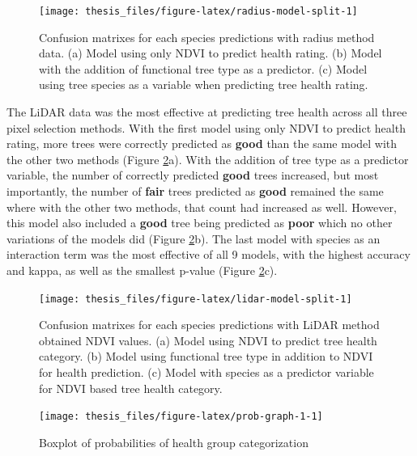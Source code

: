 \documentclass[12pt,twoside]{reedthesis}
\begin{document}
\begin{figure}

{\centering \texttt{[image: thesis\_files/figure-latex/radius-model-split-1]} 

}

\caption[Confusion matrixes for Radius method predictive models]{Confusion matrixes for each species predictions with radius method data. (a) Model using only NDVI to predict health rating. (b) Model with the addition of functional tree type as a predictor. (c) Model using tree species as a variable when predicting tree health rating.}\label{fig:radius-model-split}
\end{figure}
The LiDAR data was the most effective at predicting tree health across all three pixel selection methods. With the first model using only NDVI to predict health rating, more trees were correctly predicted as \textbf{good} than the same model with the other two methods (Figure \ref{fig:lidar-model-split}a). With the addition of tree type as a predictor variable, the number of correctly predicted \textbf{good} trees increased, but most importantly, the number of \textbf{fair} trees predicted as \textbf{good} remained the same where with the other two methods, that count had increased as well. However, this model also included a \textbf{good} tree being predicted as \textbf{poor} which no other variations of the models did (Figure \ref{fig:lidar-model-split}b). The last model with species as an interaction term was the most effective of all 9 models, with the highest accuracy and kappa, as well as the smallest p-value (Figure \ref{fig:lidar-model-split}c).
\begin{figure}

{\centering \texttt{[image: thesis\_files/figure-latex/lidar-model-split-1]} 

}

\caption[Confusion matrixes for LiDAR method predictive models]{Confusion matrixes for each species predictions with LiDAR method obtained NDVI values. (a) Model using NDVI to predict tree health category. (b) Model using functional tree type in addition to NDVI for health prediction. (c) Model with species as a predictor variable for NDVI based tree health category.}\label{fig:lidar-model-split}
\end{figure}
\begin{figure}

{\centering \texttt{[image: thesis\_files/figure-latex/prob-graph-1-1]} 

}

\caption{Boxplot of probabilities of health group categorization}\label{fig:prob-graph-1}
\end{figure}
\end{document}
